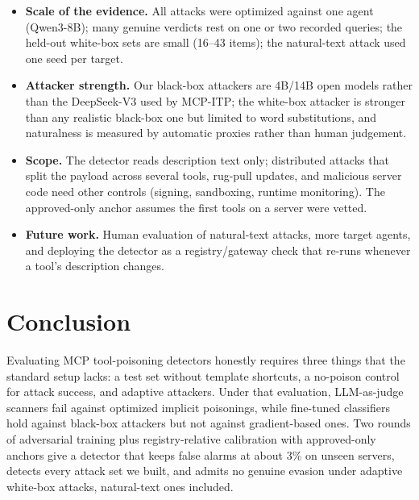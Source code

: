 \documentclass{article}
\begin{document}
\begin{itemize}
\item \textbf{Scale of the evidence.} All attacks were optimized against one agent (Qwen3-8B); many genuine verdicts
rest on one or two recorded queries; the held-out white-box sets are small (16--43 items); the natural-text attack
used one seed per target.
\item \textbf{Attacker strength.} Our black-box attackers are 4B/14B open models rather than the DeepSeek-V3 used by
MCP-ITP; the white-box attacker is stronger than any realistic black-box one but limited to word substitutions, and
naturalness is measured by automatic proxies rather than human judgement.
\item \textbf{Scope.} The detector reads description text only; distributed attacks that split the payload across
several tools, rug-pull updates, and malicious server code need other controls (signing, sandboxing, runtime
monitoring). The approved-only anchor assumes the first tools on a server were vetted.
\item \textbf{Future work.} Human evaluation of natural-text attacks, more target agents, and deploying the detector
as a registry/gateway check that re-runs whenever a tool's description changes.
\end{itemize}

\section{Conclusion}

Evaluating MCP tool-poisoning detectors honestly requires three things that the standard setup lacks: a test set
without template shortcuts, a no-poison control for attack success, and adaptive attackers. Under that evaluation,
LLM-as-judge scanners fail against optimized implicit poisonings, while fine-tuned classifiers hold against black-box
attackers but not against gradient-based ones. Two rounds of adversarial training plus registry-relative calibration
with approved-only anchors give a detector that keeps false alarms at about 3\% on unseen servers, detects every attack
set we built, and admits no genuine evasion under adaptive white-box attacks, natural-text ones included.



\end{document}
